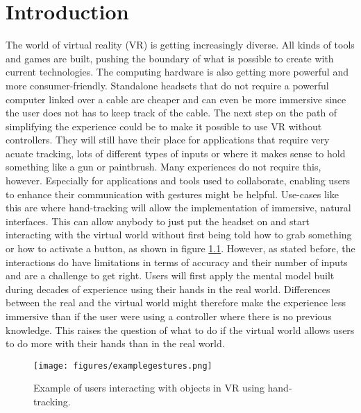 
\chapter{Introduction}
The world of virtual reality (VR) is getting increasingly diverse. All kinds of tools and games are built, pushing the boundary of what is possible to create with current technologies. The computing hardware is also getting more powerful and more consumer-friendly. Standalone headsets that do not require a powerful computer linked over a cable are cheaper and can even be more immersive since the user does not has to keep track of the cable. The next step on the path of simplifying the experience could be to make it possible to use VR without controllers. They will still have their place for applications that require very acuate tracking, lots of different types of inputs or where it makes sense to hold something like a gun or paintbrush. Many experiences do not require this, however. Especially for applications and tools used to collaborate, enabling users to enhance their communication with gestures might be helpful. Use-cases like this are where hand-tracking will allow the implementation of immersive, natural interfaces. This can allow anybody to just put the headset on and start interacting with the virtual world without first being told how to grab something or how to activate a button, as shown in figure \ref{fig:example}. However, as stated before, the interactions do have limitations in terms of accuracy and their number of inputs and are a challenge to get right. Users will first apply the mental model built during decades of experience using their hands in the real world. Differences between the real and the virtual world might therefore make the experience less immersive than if the user were using a controller where there is no previous knowledge. This raises the question of what to do if the virtual world allows users to do more with their hands than in the real world. 

\begin{figure}[!ht]
    \centering
    \texttt{[image: figures/examplegestures.png]}
    \caption{Example of users interacting with objects in VR using hand-tracking. \cite{Han}}
    \label{fig:example}
\end{figure}


